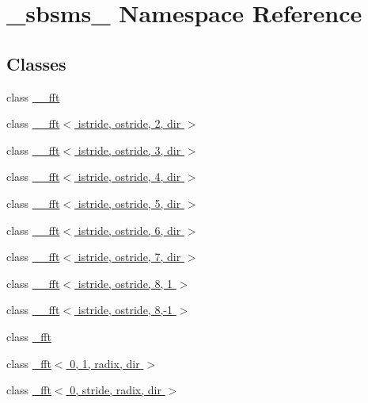 \hypertarget{namespace__sbsms__}{}\section{\+\_\+sbsms\+\_\+ Namespace Reference}
\label{namespace__sbsms__}
\subsection*{Classes}
\begin{DoxyCompactItemize}
\item 
class \hyperlink{class__sbsms___1_1____fft}{\+\_\+\+\_\+fft}
\item 
class \hyperlink{class__sbsms___1_1____fft_3_01istride_00_01ostride_00_012_00_01dir_01_4}{\+\_\+\+\_\+fft$<$ istride, ostride, 2, dir $>$}
\item 
class \hyperlink{class__sbsms___1_1____fft_3_01istride_00_01ostride_00_013_00_01dir_01_4}{\+\_\+\+\_\+fft$<$ istride, ostride, 3, dir $>$}
\item 
class \hyperlink{class__sbsms___1_1____fft_3_01istride_00_01ostride_00_014_00_01dir_01_4}{\+\_\+\+\_\+fft$<$ istride, ostride, 4, dir $>$}
\item 
class \hyperlink{class__sbsms___1_1____fft_3_01istride_00_01ostride_00_015_00_01dir_01_4}{\+\_\+\+\_\+fft$<$ istride, ostride, 5, dir $>$}
\item 
class \hyperlink{class__sbsms___1_1____fft_3_01istride_00_01ostride_00_016_00_01dir_01_4}{\+\_\+\+\_\+fft$<$ istride, ostride, 6, dir $>$}
\item 
class \hyperlink{class__sbsms___1_1____fft_3_01istride_00_01ostride_00_017_00_01dir_01_4}{\+\_\+\+\_\+fft$<$ istride, ostride, 7, dir $>$}
\item 
class \hyperlink{class__sbsms___1_1____fft_3_01istride_00_01ostride_00_018_00_011_01_4}{\+\_\+\+\_\+fft$<$ istride, ostride, 8, 1 $>$}
\item 
class \hyperlink{class__sbsms___1_1____fft_3_01istride_00_01ostride_00_018_00-1_01_4}{\+\_\+\+\_\+fft$<$ istride, ostride, 8,-\/1 $>$}
\item 
class \hyperlink{class__sbsms___1_1__fft}{\+\_\+fft}
\item 
class \hyperlink{class__sbsms___1_1__fft_3_010_00_011_00_01radix_00_01dir_01_4}{\+\_\+fft$<$ 0, 1, radix, dir $>$}
\item 
class \hyperlink{class__sbsms___1_1__fft_3_010_00_01stride_00_01radix_00_01dir_01_4}{\+\_\+fft$<$ 0, stride, radix, dir $>$}
\item 

\end{DoxyCompactItemize}

